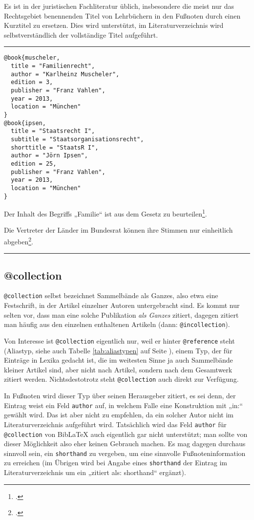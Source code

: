 \documentclass[11pt,a4paper,DIV=calc,draft]{scrartcl}
\newcommand\software[1]{\textsf{#1}}
\newcommand\Biblatex{\software{Bib\LaTeX{}}\xspace}
\newenvironment{rubexample}{\par\vspace{\baselineskip}\hrule\par\begin{refsection}}{\end{refsection}\par\hrule\par\vspace{\baselineskip}}
\begin{document}
Es ist in der juristischen Fachliteratur üblich, insbesondere die
meist nur das Rechtsgebiet benennenden Titel von Lehrbüchern in den
Fußnoten durch einen Kurztitel zu ersetzen. Dies wird unterstützt, im
Literaturverzeichnis wird selbstverständlich der vollständige Titel
aufgeführt.

\begin{rubexample}

\begin{verbatim}
@book{muscheler,
  title = "Familienrecht",
  author = "Karlheinz Muscheler",
  edition = 3,
  publisher = "Franz Vahlen",
  year = 2013,
  location = "München"
}
@book{ipsen,
  title = "Staatsrecht I",
  subtitle = "Staatsorganisationsrecht",
  shorttitle = "StaatsR I",
  author = "Jörn Ipsen",
  edition = 25,
  publisher = "Franz Vahlen",
  year = 2013,
  location = "München"
}
\end{verbatim}

Der Inhalt des Begriffs „Familie“ ist aus dem Gesetz zu
beurteilen\footcite[\S\,1 Rnr. 3]{muscheler}.

Die Vertreter der Länder im Bundesrat können ihre Stimmen nur
einheitlich abgeben\footcite[\S\,7 Rnr. 343ff]{ipsen}.

\printbibliography
\end{rubexample}

\subsection{@collection}

\verb+@collection+ selbst bezeichnet Sammelbände als Ganzes, also etwa
eine Festschrift, in der Artikel einzelner Autoren untergebracht
sind. Es kommt nur selten vor, dass man eine solche Publikation
\emph{als Ganzes} zitiert, dagegen zitiert man häufig aus den
einzelnen enthaltenen Artikeln (dann:
\verb+@incollection+).

Von Interesse ist \verb+@collection+ eigentlich nur, weil er hinter
\verb+@reference+ steht (Aliastyp, siehe auch Tabelle
\ref{tab:aliastypen} auf Seite \pageref{tab:aliastypen}), einem Typ,
der für Einträge in Lexika gedacht ist, die im weitesten Sinne ja auch
Sammelbände kleiner Artikel sind, aber nicht nach Artikel, sondern
nach dem Gesamtwerk zitiert werden. Nichtsdestotrotz steht
\verb+@collection+ auch direkt zur Verfügung.

In Fußnoten wird dieser Typ über seinen Herausgeber zitiert, es sei
denn, der Eintrag weist ein Feld \verb+author+ auf, in welchem Falle
eine Konstruktion mit „in:“ gewählt wird. Das ist aber nicht zu
empfehlen, da ein solcher Autor nicht im Literaturverzeichnis
aufgeführt wird. Tatsächlich wird das Feld \verb+author+ für
\verb+@collection+ von \Biblatex auch eigentlich gar nicht
unterstützt; man sollte von dieser Möglichkeit also eher keinen
Gebrauch machen. Es mag dagegen durchaus sinnvoll sein, ein
\verb+shorthand+ zu vergeben, um eine sinnvolle Fußnoteninformation zu
erreichen (im Übrigen wird bei Angabe eines \verb+shorthand+ der
Eintrag im Literaturverzeichnis um ein „zitiert als: shorthand“ ergänzt).
\end{document}
